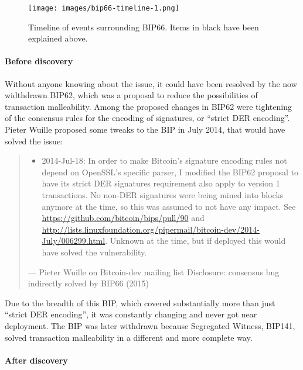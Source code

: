 \begin{figure}
\hypertarget{fig-bip66-timeline-1}{%
\centering
\texttt{[image: images/bip66-timeline-1.png]}
\caption{Timeline of events surrounding BIP66. Items in black have been
explained above.}\label{fig-bip66-timeline-1}
}
\end{figure}

\hypertarget{_before_discovery}{%
\paragraph{Before discovery}\label{_before_discovery}}

Without anyone knowing about the issue, it could have been resolved by
the now widthdrawn BIP62, which was a proposal to reduce the
possibilities of transaction malleability. Among the proposed changes in
BIP62 were tightening of the consensus rules for the encoding of
signatures, or ``strict DER encoding''. Pieter Wuille proposed some
tweaks to the BIP in July 2014, that would have solved the issue:

\begin{quote}
\begin{itemize}
\item
  2014-Jul-18: In order to make Bitcoin's signature encoding rules not
  depend on OpenSSL's specific parser, I modified the BIP62 proposal to
  have its strict DER signatures requirement also apply to version 1
  transactions. No non-DER signatures were being mined into blocks
  anymore at the time, so this was assumed to not have any impact. See
  \url{https://github.com/bitcoin/bips/pull/90} and
  \url{http://lists.linuxfoundation.org/pipermail/bitcoin-dev/2014-July/006299.html}.
  Unknown at the time, but if deployed this would have solved the
  vulnerability.
\end{itemize}

---  Pieter Wuille on Bitcoin-dev mailing list Disclosure: consensus bug
indirectly solved by BIP66 (2015)
\end{quote}

Due to the breadth of this BIP, which covered substantially more than
just ``strict DER encoding'', it was constantly changing and never got
near deployment. The BIP was later withdrawn because Segregated Witness,
BIP141, solved transaction malleability in a different and more complete
way.

\hypertarget{_after_discovery}{%
\paragraph{After discovery}\label{_after_discovery}}

